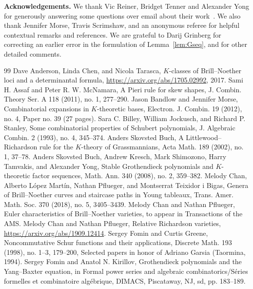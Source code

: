 \documentclass[11pt]{article}
\theoremstyle{definition}
\newcommand{\longthanks}[1]{\par\noindent\textbf{Acknowledgements.} #1\par}
\begin{document}
\longthanks{We thank Vic Reiner, Bridget Tenner and Alexander Yong for generously answering some questions over email about their work~\cite{reiner-tenner-yong}. We also thank Jennifer Morse, Travis Scrimshaw, and an anonymous referee for helpful contextual remarks and references. We are grateful to Darij Grinberg for correcting an earlier error in the formulation of Lemma~\ref{lem:Gseq}, and for other detailed comments.}
\begin{thebibliography}{99}
 Dave Anderson, Linda Chen, and Nicola Tarasca, $K$-classes of Brill--Noether loci and a determinantal formula, \url{https://arxiv.org/abs/1705.02992}, 2017.
 Sami H. Assaf and Peter R. W. McNamara, A Pieri rule for skew shapes, J. Combin. Theory Ser. A 118 (2011), no. 1, 277--290.
 Jason Bandlow and Jennifer Morse, Combinatorial expansions in $K$-theoretic bases, Electron. J. Combin. 19 (2012), no. 4, Paper no. 39 (27 pages).
 Sara C. Billey, William Jockusch, and Richard P. Stanley, Some combinatorial properties of Schubert polynomials, J. Algebraic Combin. 2 (1993), no. 4, 345--374.
 Anders Skovsted Buch, A Littlewood--Richardson rule for the $K$-theory of Grassmannians, Acta Math. 189 (2002), no. 1, 37--78.
 Anders Skovsted Buch, Andrew Kresch, Mark Shimozono, Harry Tamvakis, and Alexander Yong, Stable Grothendieck polynomials and $K$-theoretic factor sequences, Math. Ann. 340 (2008), no. 2, 359--382.
 Melody Chan, Alberto L\'opez Mart\'in, Nathan Pflueger, and Montserrat Teixidor i Bigas, Genera of Brill--Noether curves and staircase paths in Young tableaux, Trans. Amer. Math. Soc. 370 (2018), no. 5, 3405--3439.
 Melody Chan and Nathan Pflueger, Euler characteristics of Brill--Noether varieties, to appear in Transactions of the AMS.
 Melody Chan and Nathan Pflueger, Relative Richardson varieties, \url{https://arxiv.org/abs/1909.12414}.
 Sergey Fomin and Curtis Greene, Noncommutative Schur functions and their applications, Discrete Math. 193 (1998), no. 1--3, 179--200, Selected papers in honor of Adriano Garsia (Taormina, 1994).
 Sergey Fomin and Anatol N. Kirillov, Grothendieck polynomials and the Yang--Baxter equation, in Formal power series and algebraic combinatorics/S\'eries formelles et combinatoire alg\'ebrique, DIMACS, Piscataway, NJ, sd, pp. 183--189.

\end{thebibliography}
\end{document}
